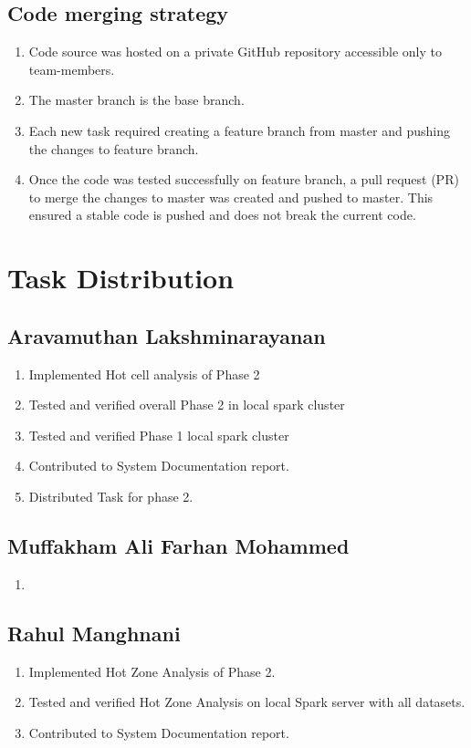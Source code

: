 \subsection{Code merging strategy}
\begin{enumerate}
    \item Code source was hosted on a private GitHub repository accessible only to team-members.
    \item The master branch is the base branch.
    \item Each new task required creating a feature branch from master and pushing the changes to feature branch.
    \item Once the code was tested successfully on feature branch, a pull request (PR) to merge the changes to master was created and pushed to master. This ensured a stable code is pushed and does not break the current code.
\end{enumerate}

\newpage

\section{Task Distribution}

\subsection{Aravamuthan Lakshminarayanan}
\begin{enumerate}
    \item Implemented Hot cell analysis of Phase 2
    \item Tested and verified overall Phase 2 in local spark cluster 
    \item Tested and verified Phase 1 local spark cluster
    \item Contributed to System Documentation report.
    \item Distributed Task for phase 2.
\end{enumerate}

\subsection{Muffakham Ali Farhan Mohammed}
\begin{enumerate}
    \item
\end{enumerate}

\subsection{Rahul Manghnani}
\begin{enumerate}
    \item Implemented Hot Zone Analysis of Phase 2.
		\item Tested and verified Hot Zone Analysis on local Spark server with all datasets.
		\item Contributed to System Documentation report.
\end{enumerate}

